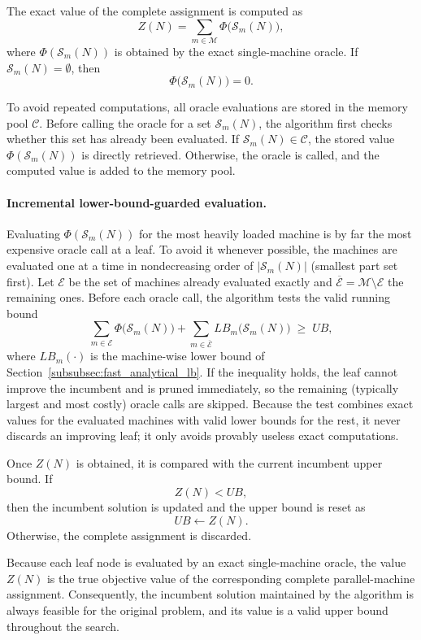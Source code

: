 \documentclass[review,3p,times,authoryear]{elsarticle}
\begin{document}
The exact value of the complete assignment is computed as
\[
Z(N)
=
\sum_{m\in\mathcal{M}}
\Phi\bigl(\mathcal{S}_m(N)\bigr),
\]
where $\Phi(\mathcal{S}_m(N))$ is obtained by the exact single-machine
oracle. If $\mathcal{S}_m(N)=\emptyset$, then
\[
\Phi\bigl(\mathcal{S}_m(N)\bigr)=0.
\]

To avoid repeated computations, all oracle evaluations are stored in the
memory pool $\mathcal{C}$. Before calling the oracle for a set
$\mathcal{S}_m(N)$, the algorithm first checks whether this set has already
been evaluated. If $\mathcal{S}_m(N)\in\mathcal{C}$, the stored value
$\Phi(\mathcal{S}_m(N))$ is directly retrieved. Otherwise, the oracle is
called, and the computed value is added to the memory pool.


\paragraph*{Incremental lower-bound-guarded evaluation.}
Evaluating $\Phi(\mathcal{S}_m(N))$ for the most heavily loaded machine is by
far the most expensive oracle call at a leaf. To avoid it whenever possible,
the machines are evaluated one at a time in nondecreasing order of
$|\mathcal{S}_m(N)|$ (smallest part set first). Let $\mathcal{E}$ be the set of
machines already evaluated exactly and
$\overline{\mathcal{E}}=\mathcal{M}\setminus\mathcal{E}$ the remaining ones.
Before each oracle call, the algorithm tests the valid running bound
\[
\sum_{m\in\mathcal{E}}\Phi\bigl(\mathcal{S}_m(N)\bigr)
+\sum_{m\in\overline{\mathcal{E}}}LB_m\bigl(\mathcal{S}_m(N)\bigr)\;\ge\;UB,
\]
where $LB_m(\cdot)$ is the machine-wise lower bound of
Section~\ref{subsubsec:fast_analytical_lb}. If the inequality holds, the leaf
cannot improve the incumbent and is pruned immediately, so the remaining
(typically largest and most costly) oracle calls are skipped. Because the test
combines exact values for the evaluated machines with valid lower bounds for
the rest, it never discards an improving leaf; it only avoids provably useless
exact computations.

Once $Z(N)$ is obtained, it is compared with the current incumbent upper
bound. If
\[
Z(N)<UB,
\]
then the incumbent solution is updated and the upper bound is reset as
\[
UB\leftarrow Z(N).
\]
Otherwise, the complete assignment is discarded.

Because each leaf node is evaluated by an exact single-machine oracle, the
value $Z(N)$ is the true objective value of the corresponding complete
parallel-machine assignment. Consequently, the incumbent solution maintained
by the algorithm is always feasible for the original problem, and its value
is a valid upper bound throughout the search.
\end{document}
